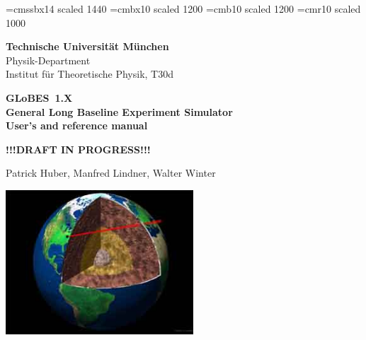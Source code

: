 \documentclass[a4paper,12pt,twoside]{book}
\newcommand{\GLOBES}{{\sf GLoBES}}
\begin{document}
 

\thispagestyle{empty}
{
\setlength{\parindent}{0cm}


\font\fa=cmssbx14 scaled 1440
\font\fb=cmbx10 scaled 1200
\font\fc=cmb10 scaled 1200
\font\fd=cmr10 scaled 1000  

{\setlength{\baselineskip}{1.2cm}}



\begin{minipage}{7cm}
\begin{center}
{\bf Technische Universit{\"a}t M{\"u}nchen} \\
Physik-Department \\
Institut f{\"u}r Theoretische Physik, T30d \\
\end{center}
\end{minipage}

\vspace{-2cm}

\hfill \oTUM{3.5cm}

\vspace{3cm}

\begin{center}
{ \Large \bf
\GLOBES\ 1.X \\
General Long Baseline Experiment Simulator \\ }
\vspace*{0.5cm}
{\large \bf User's and reference manual }

\vspace*{1.5cm}
{\large \bf !!!DRAFT IN PROGRESS!!! }
\end{center}

\vspace{1cm}

\begin{center}
{\large Patrick Huber, Manfred Lindner, Walter Winter}
\end{center}

\vspace{1cm}

\begin{center}
\colorbox{black}{\includegraphics[width=7cm]{earthint}}


\end{center}}
\end{document}

